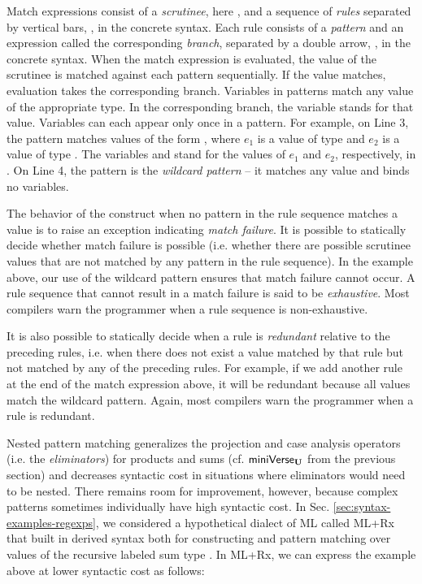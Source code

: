 Match expressions consist of a \emph{scrutinee}, here , and a sequence of \emph{rules} separated by vertical bars, \li{|}, in the concrete syntax. Each rule consists of a \emph{pattern} and an {expression} called the corresponding \emph{branch}, separated by a double arrow, \li{=>}, in the concrete syntax. When the {match} expression is evaluated, the value of the scrutinee is matched against each pattern sequentially. If the value matches, evaluation takes the corresponding branch. Variables in patterns match any value of the appropriate type. In the corresponding branch, the variable stands for that value. Variables can each appear only once in a pattern.  
For example, on Line 3, the pattern  matches values of the form , where $e_1$ is a value of type  and $e_2$ is a value of type . The variables  and  stand for the values of $e_1$ and $e_2$, respectively, in . On Line 4, the pattern \li{_} is the \emph{wildcard pattern} -- it matches any value and binds no variables.

The behavior of the  construct when no pattern in the rule sequence matches a value is to raise an exception indicating \emph{match failure}. It is possible to statically decide whether match failure is possible (i.e. whether there are possible scrutinee values that are not matched by any pattern in the rule sequence). In the example above, our use of the wildcard pattern ensures that match failure cannot occur. A rule sequence that cannot result in a match failure is said to be \emph{exhaustive}. Most compilers warn the programmer when a rule sequence is non-exhaustive.

It is also possible to statically decide when a rule is \emph{redundant} relative to the preceding rules, i.e. when there does not exist a value matched by that rule but not matched by any of the preceding rules. For example, if we add  another rule at the end of the match expression above, it will be redundant because all values match the wildcard pattern. Again, most compilers warn the programmer when a rule is redundant.

Nested pattern matching generalizes the projection and case analysis operators (i.e. the \emph{eliminators}) for products and sums (cf. $\mathsf{miniVerse}_\textbf{U}$ from the previous section) and decreases syntactic cost in situations where eliminators would need to be nested. There remains room for improvement, however, because complex patterns sometimes    individually have high syntactic cost. In Sec. \ref{sec:syntax-examples-regexps}, we considered a hypothetical dialect of ML called ML+Rx that built in derived syntax both for constructing and pattern matching over values of the recursive labeled sum type . In ML+Rx, we can express the example above at lower syntactic cost as follows:

